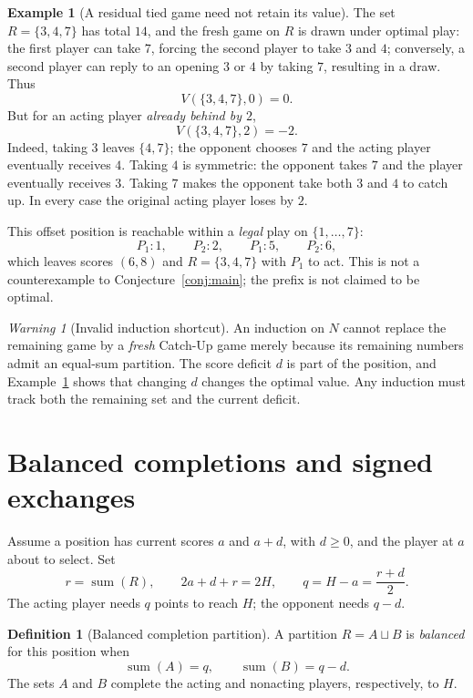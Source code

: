 \documentclass[11pt,a4paper]{article}
\theoremstyle{definition}
\newtheorem{definition}[theorem]{Definition}
\newtheorem{example}[theorem]{Example}
\theoremstyle{remark}
\newtheorem{warning}[theorem]{Warning}
\newcommand{\sm}{\operatorname{sum}}
\begin{document}
\begin{example}[A residual tied game need not retain its value]
\label{ex:residual}
The set $R=\{3,4,7\}$ has total $14$, and the fresh game on $R$
is drawn under optimal play: the first player can take $7$, forcing
the second player to take $3$ and $4$; conversely, a second player
can reply to an opening $3$ or $4$ by taking $7$, resulting in a draw.
Thus
\[
V(\{3,4,7\},0)=0.
\]
But for an acting player \emph{already behind by $2$},
\begin{equation}\label{eq:offsetexample}
V(\{3,4,7\},2)=-2.
\end{equation}
Indeed, taking $3$ leaves $\{4,7\}$; the opponent chooses $7$ and
the acting player eventually receives $4$.  Taking $4$ is symmetric:
the opponent takes $7$ and the player eventually receives $3$.
Taking $7$ makes the opponent take both $3$ and $4$ to catch up.
In every case the original acting player loses by $2$.

This offset position is reachable within a \emph{legal} play on
$\{1,\ldots,7\}$:
\[
P_1:1,\qquad P_2:2,\qquad P_1:5,\qquad P_2:6,
\]
which leaves scores $(6,8)$ and $R=\{3,4,7\}$ with $P_1$ to act.
This is not a counterexample to Conjecture~\ref{conj:main}; the
prefix is not claimed to be optimal.
\end{example}

\begin{warning}[Invalid induction shortcut]
An induction on $N$ cannot replace the remaining game by a \emph{fresh}
Catch-Up game merely because its remaining numbers admit an equal-sum
partition.  The score deficit $d$ is part of the position, and
Example~\ref{ex:residual} shows that changing $d$ changes the
optimal value.  Any induction must track both the remaining set
and the current deficit.
\end{warning}

\section{Balanced completions and signed exchanges}

Assume a position has current scores $a$ and $a+d$, with $d\ge0$,
and the player at $a$ about to select.  Set
\[
r=\sm(R),\qquad 2a+d+r=2H,\qquad
q=H-a=\frac{r+d}{2}.
\]
The acting player needs $q$ points to reach $H$; the opponent
needs $q-d$.

\begin{definition}[Balanced completion partition]
A partition $R=A\sqcup B$ is \emph{balanced} for this position when
\begin{equation}\label{eq:balanced}
\boxed{\sm(A)=q,\qquad\sm(B)=q-d.}
\end{equation}
The sets $A$ and $B$ complete the acting and nonacting players,
respectively, to $H$.
\end{definition}
\end{document}
